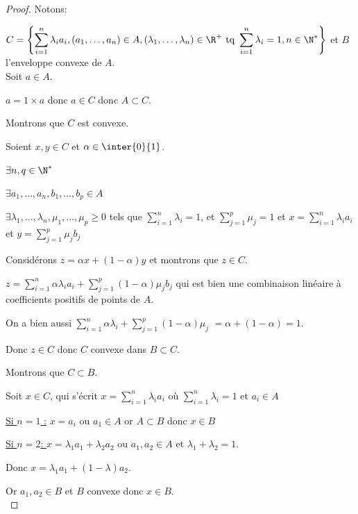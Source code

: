 \begin{proof}
    Notons:
    
    $\displaystyle C = \left\{\sum_{i = 1}^n \lambda_i a_i, (a_1, \dots, a_n) \in A, (\lambda_1, \dots, \lambda_n) \in \R^+ \text{ tq } \sum_{i = 1}^n \lambda_i = 1, n \in \N^*\right\}$
    et $B$ l'enveloppe convexe de $A$. \\

    Soit $a \in A$. 

    $a = 1 \times a$ donc $a \in C$ donc $A \subset C$. 

    Montrons que $C$ est convexe. 

    Soient $x, y \in C$ et $\alpha \in \inter{0}{1}$. 

    $\exists n, q \in \N^*$

    $\exists a_1, \dots, a_n, b_1, \dots, b_p \in A$

    $\exists \lambda_1, \dots, \lambda_n, \mu_1, \dots, \mu_p \geqslant 0$ tels que 
    $\displaystyle \sum_{i = 1}^n \lambda_i = 1$, et $\displaystyle \sum_{j = 1}^p \mu_j = 1$ et 
    $\displaystyle x = \sum_{i = 1}^n \lambda_i a_i$ et $\displaystyle y = \sum_{j = 1}^p \mu_j b_j$

    Considérons $z = \alpha x + (1 - \alpha)y$ et montrons que $z \in C$. 

    $\displaystyle z = \sum_{i = 1}^n \alpha \lambda_i a_i + \sum_{j = 1}^p (1 - \alpha) \mu_j b_j$
    qui est bien une combinaison linéaire à coefficients positifs de points de $A$. 

    On a bien aussi $\displaystyle \sum_{i = 1}^n \alpha \lambda_i + \sum_{j = 1}^p (1 - \alpha) \mu_j$
    $ = \alpha + (1 - \alpha) = 1$. 

    Donc $z \in C$ donc $C$ convexe dans $B \subset C$. 

    Montrons que $C \subset B$. 

    Soit $x \in C$, qui s'écrit $\displaystyle x = \sum_{i = 1}^n \lambda_i a_i$ où 
    $\displaystyle \sum_{i = 1}^n \lambda_i = 1$ et $a_i \in A$

    \underline{Si $n = 1$ :} $x = a_i$ ou $a_1 \in A$
    or $A \subset B$ donc $x \in B$

    \underline{Si $n = 2$: } $x = \lambda_1 a_1 + \lambda_2 a_2$ ou $a_1, a_2 \in A$ et 
    $\lambda_1 + \lambda_2 = 1$. 

    Donc $x = \lambda_1 a_1 + (1 - \lambda)a_2$. 

    Or $a_1, a_2 \in B$ et $B$ convexe donc $x \in B$. \\


\end{proof}
